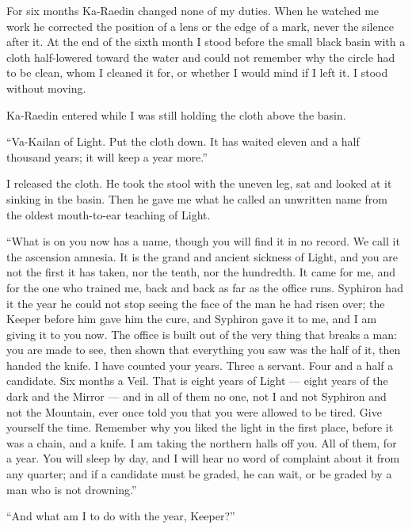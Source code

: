 For six months Ka-Raedin changed none of my duties. When he watched me work he corrected the position of a lens or the edge of a mark, never the silence after it. At the end of the sixth month I stood before the small black basin with a cloth half-lowered toward the water and could not remember why the circle had to be clean, whom I cleaned it for, or whether I would mind if I left it. I stood without moving.\par

Ka-Raedin entered while I was still holding the cloth above the basin.\par

``Va-Kailan of Light. Put the cloth down. It has waited eleven and a half thousand years; it will keep a year more.''\par

I released the cloth. He took the stool with the uneven leg, sat and looked at it sinking in the basin. Then he gave me what he called an unwritten name from the oldest mouth-to-ear teaching of Light.\par

``What is on you now has a name, though you will find it in no record. We call it the ascension amnesia. It is the grand and ancient sickness of Light, and you are not the first it has taken, nor the tenth, nor the hundredth. It came for me, and for the one who trained me, back and back as far as the office runs. Syphiron had it the year he could not stop seeing the face of the man he had risen over; the Keeper before him gave him the cure, and Syphiron gave it to me, and I am giving it to you now. The office is built out of the very thing that breaks a man: you are made to see, then shown that everything you saw was the half of it, then handed the knife. I have counted your years. Three a servant. Four and a half a candidate. Six months a Veil. That is eight years of Light --- eight years of the dark and the Mirror --- and in all of them no one, not I and not Syphiron and not the Mountain, ever once told you that you were allowed to be tired. Give yourself the time. Remember why you liked the light in the first place, before it was a chain, and a knife. I am taking the northern halls off you. All of them, for a year. You will sleep by day, and I will hear no word of complaint about it from any quarter; and if a candidate must be graded, he can wait, or be graded by a man who is not drowning.''\par

``And what am I to do with the year, Keeper?''\par

